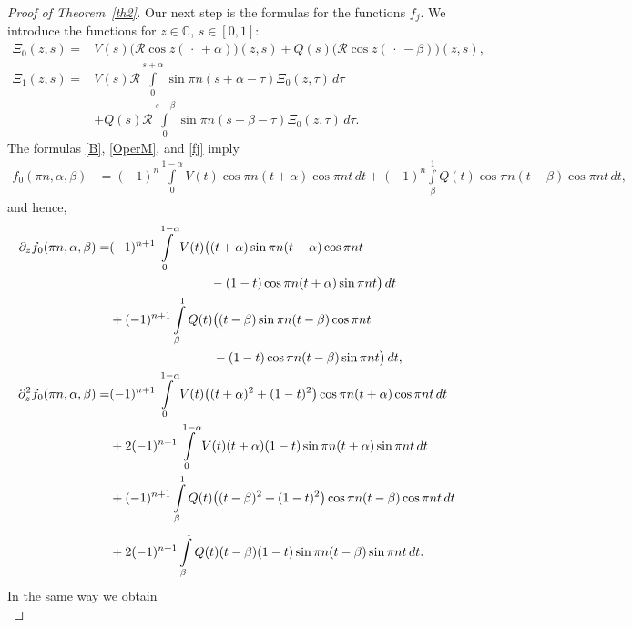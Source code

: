 \documentclass[10pt, a4paper]{article}
\theoremstyle{plain}
\theoremstyle{definition}
\numberwithin{equation}{section}
\def\a{\alpha}
\def\b{\beta}
\begin{document}
\begin{proof}[Proof of Theorem~\ref{th2}]
Our next step is the formulas for  the functions $f_j$. We introduce the
functions for $z\in\mathds{C}$, $s\in [0, 1]$:
\begin{align*}
\Xi_0(z, s) = &V(s)\big(\mathcal{R}\cos z(\,\cdot\,+\alpha)\big)(z,s) +Q(s)\big(\mathcal{R}\cos z(\,\cdot\,-\beta)\big)(z,s), \\
\Xi_1(z, s) =& V(s)\mathcal{R}\int\limits_0^{s+\alpha}\sin \pi n(s+\alpha-\tau)\Xi_0(z, \tau)\,d\tau \\
& +Q(s)\mathcal{R}\int\limits_0^{s-\beta}\sin \pi n(s-\beta-\tau)\Xi_0(z, \tau)\,d\tau.
\end{align*}
The formulas \eqref{B}, \eqref{OperM}, and \eqref{fj} imply
\begin{equation}
\label{polf0}
\begin{aligned}
f_0(\pi n,\a,\b) &= (-1)^n\int\limits_0^{1-\alpha}V(t)\cos\pi n(t+\alpha)\cos\pi nt\,dt
+(-1)^n\int\limits_\beta^1Q(t)\cos\pi n(t-\beta)\cos\pi nt\,dt,
\end{aligned}
\end{equation}
and hence,
\begin{equation} \label{polf0'}
\begin{aligned}
\partial_z f_0(\pi n,\a,\b)=& (-1)^{n+1}\int\limits_0^{1-\alpha}V(t)\big((t+\alpha)\sin\pi n(t+\alpha)\cos\pi nt
\\
&\hphantom{(-1)^{n+1}\int\limits_0^{1-\alpha}V(t)\big(}-(1-t)\cos\pi n(t+\alpha)\sin\pi nt\big)\,dt \\
& +(-1)^{n+1}\int\limits_\beta^1Q(t)\big((t-\beta)\sin\pi n(t-\beta)\cos\pi nt
\\
&\hphantom{+(-1)^{n+1}\int\limits_\beta^1Q(t)\big(}-(1-t)\cos\pi n(t-\beta)\sin\pi nt\big)\,dt,
\\
 \partial_z^2f_0(\pi n,\alpha,\beta)=&(-1)^{n+1}\int\limits_0^{1-\alpha}V(t)\big((t+\alpha)^2
+(1-t)^2\big)\cos\pi n(t+\alpha)\cos\pi nt\,dt \\
& +2(-1)^{n+1}\int\limits_0^{1-\alpha}V(t)(t+\alpha)(1-t)\sin\pi n(t+\alpha)\sin\pi nt\,dt \\
& +(-1)^{n+1}\int\limits_\beta^1 Q(t)\big((t-\beta)^2+(1-t)^2\big)\cos\pi n(t-\beta)\cos\pi nt\,dt
\\
& +2(-1)^{n+1}\int\limits_\beta^1 Q(t)(t-\beta)(1-t)\sin\pi n(t-\beta)\sin\pi nt\,dt.
\end{aligned}
\end{equation}
In the same way we obtain
\begin{equation}\label{polf1}

\end{equation}
\end{proof}
\end{document}
